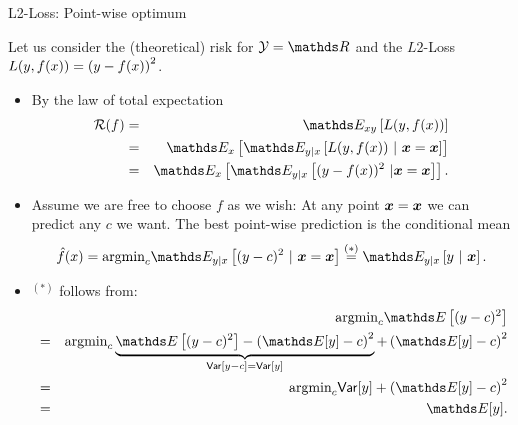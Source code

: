 \begin{vbframe}{L2-Loss: Point-wise optimum}

Let us consider the (theoretical) risk for  $\Yspace = \R$ and the $L2$-Loss $L(y, f(x)) = \left(y-f(x)\right)^2$. %

\begin{itemize}
\item By the law of total expectation
  \begin{eqnarray*}
    \riskf &=& \E_{xy} \left[\Lxy\right] 
    \\ &=& \E_x \left[\E_{y|x}\left[\Lxy~|~\xv = \xv\right]\right] \\
  &=& \E_x
  \left[\E_{y|x}\left[(y-\fx)^2~|\xv = \xv\right]\right]. 
  \end{eqnarray*}
\item Assume we are free to choose $f$ as we wish: At any point $\bm{x} = \bm{x}$ we can predict any $c$ we want. The best point-wise prediction is the conditional mean
$$
  \fxh = \mbox{argmin}_c \E_{y|x}\left[(y - c)^2 ~|~ \xv = \xv \right]\overset{(*)}{=} \E_{y|x} \left[y ~|~ \xv \right]. 
$$

\framebreak 

\item $^{(*)}$ follows from:
\begin{eqnarray*}
&& \mbox{argmin}_c \E\left[(y - c)^2\right] \\  &=& \mbox{argmin}_c \underbrace{\E\left[(y - c)^2\right] - \left(\E[y] - c\right)^2}_{\var[y - c] = \var[y]} + \left(\E[y] - c\right)^2 \\ &=& \mbox{argmin}_c \var[y] + \left(\E[y] - c\right)^2 \\ &=& \E[y]. 
\end{eqnarray*}
\end{itemize}

\end{vbframe}



